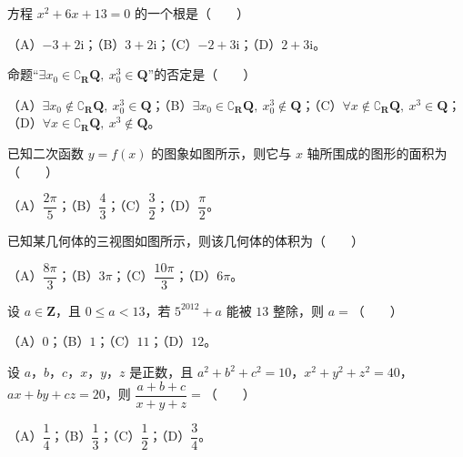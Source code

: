 \begin{question}
方程 $x^2+6x+13=0$ 的一个根是\mbox{（　　）}

（A）$-3+2\mathrm i$；（B）$3+2\mathrm i$；（C）$-2+3\mathrm i$；（D）$2+3\mathrm i$。

\end{question}
\begin{question}
命题“$\exists x_0\in\complement_{\mathbf R}\mathbf Q,\ x_0^3\in\mathbf Q$”的否定是\mbox{（　　）}

（A）$\exists x_0\notin\complement_{\mathbf R}\mathbf Q,\ x_0^3\in\mathbf Q$；（B）$\exists x_0\in\complement_{\mathbf R}\mathbf Q,\ x_0^3\notin\mathbf Q$；（C）$\forall x\notin\complement_{\mathbf R}\mathbf Q,\ x^3\in\mathbf Q$；（D）$\forall x\in\complement_{\mathbf R}\mathbf Q,\ x^3\notin\mathbf Q$。

\Needspace{0.4\textheight}
\end{question}
\begin{question}
已知二次函数 $y=f(x)$ 的图象如图所示，则它与 $x$ 轴所围成的图形的面积为\mbox{（　　）}
\nopagebreak[4]
\begin{center}\end{center}
\nopagebreak[4]
（A）$\dfrac{2\pi}{5}$；（B）$\dfrac43$；（C）$\dfrac32$；（D）$\dfrac{\pi}{2}$。

\Needspace{0.4\textheight}
\end{question}
\begin{question}
已知某几何体的三视图如图所示，则该几何体的体积为\mbox{（　　）}
\nopagebreak[4]
\begin{center}\end{center}
\nopagebreak[4]
（A）$\dfrac{8\pi}{3}$；（B）$3\pi$；（C）$\dfrac{10\pi}{3}$；（D）$6\pi$。

\end{question}
\begin{question}
设 $a\in\mathbf Z$，且 $0\leqslant a<13$，若 $5^{2012}+a$ 能被 $13$ 整除，则 $a=$\mbox{（　　）}

（A）$0$；（B）$1$；（C）$11$；（D）$12$。

\end{question}
\begin{question}
设 $a$，$b$，$c$，$x$，$y$，$z$ 是正数，且 $a^2+b^2+c^2=10$，$x^2+y^2+z^2=40$，$ax+by+cz=20$，则 $\dfrac{a+b+c}{x+y+z}=$\mbox{（　　）}

（A）$\dfrac14$；（B）$\dfrac13$；（C）$\dfrac12$；（D）$\dfrac34$。

\end{question}
